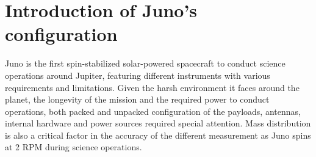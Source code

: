 \section{Introduction of Juno's configuration}
\label{sec:config_introduction}

Juno is the first spin-stabilized solar-powered spacecraft to conduct science operations around Jupiter, featuring different instruments with various requirements and limitations. Given the harsh environment it faces around the planet, the longevity of the mission and the required power to conduct operations, both packed and unpacked configuration of the payloads, antennas, internal hardware and power sources required special attention. Mass distribution is also a critical factor in the accuracy of the different measurement as Juno spins at 2 RPM during science operations. 